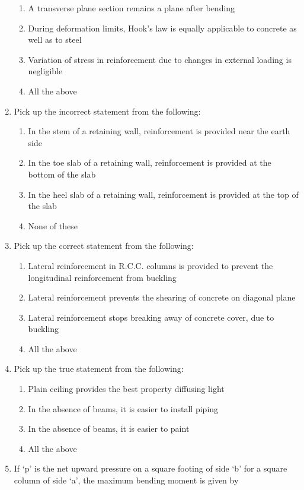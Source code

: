 \documentclass[11pt,a4paper]{article}
\begin{document}
\begin{enumerate}
\begin{enumerate}[label=\Alph*.]
\item{A transverse plane section remains a plane after bending}
\item{During deformation limits, Hook's law is equally applicable to concrete as well as to steel}
\item{Variation of stress in reinforcement due to changes in external loading is negligible}
\item{All the above}
\end{enumerate}
\item{Pick up the incorrect statement from the following:}
\begin{enumerate}[label=\Alph*.]
\item{In the stem of a retaining wall, reinforcement is provided near the earth side}
\item{In the toe slab of a retaining wall, reinforcement is provided at the bottom of the slab}
\item{In the heel slab of a retaining wall, reinforcement is provided at the top of the slab}
\item{None of these}
\end{enumerate}
\item{Pick up the correct statement from the following:}
\begin{enumerate}[label=\Alph*.]
\item{Lateral reinforcement in R.C.C. columns is provided to prevent the longitudinal reinforcement from buckling}
\item{Lateral reinforcement prevents the shearing of concrete on diagonal plane}
\item{Lateral reinforcement stops breaking away of concrete cover, due to buckling}
\item{All the above}
\end{enumerate}
\item{Pick up the true statement from the following:}
\begin{enumerate}[label=\Alph*.]
\item{Plain ceiling provides the best property diffusing light}
\item{In the absence of beams, it is easier to install piping}
\item{In the absence of beams, it is easier to paint}
\item{All the above}
\end{enumerate}
\item{If `p' is the net upward pressure on a square footing of side `b' for a square column of side `a', the maximum bending moment is given by
}
\end{enumerate}
\end{document}

